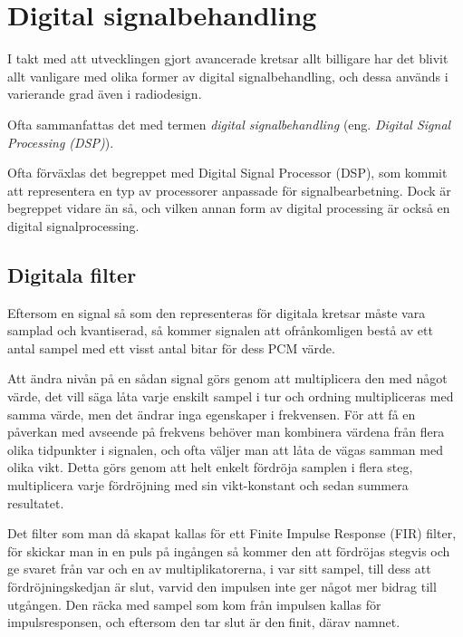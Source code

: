 \newpage
\section{Digital signalbehandling}

I takt med att utvecklingen gjort avancerade kretsar allt billigare har det
blivit allt vanligare med olika former av digital signalbehandling, och dessa
används i varierande grad även i radiodesign.

Ofta sammanfattas det med termen \emph{digital signalbehandling} (eng.
\emph{Digital Signal Processing (DSP)}).

Ofta förväxlas det begreppet med Digital Signal Processor (DSP), som kommit att
representera en typ av processorer anpassade för signalbearbetning.
Dock är begreppet vidare än så, och vilken annan form av digital processing är
också en digital signalprocessing.

\subsection{Digitala filter}
\label{digitala filter}

Eftersom en signal så som den representeras för digitala kretsar måste vara
samplad och kvantiserad, så kommer signalen att ofrånkomligen bestå av ett
antal sampel med ett visst antal bitar för dess PCM värde.

Att ändra nivån på en sådan signal görs genom att multiplicera den med något
värde, det vill säga låta varje enskilt sampel i tur och ordning multipliceras
med samma värde, men det ändrar inga egenskaper i frekvensen.
För att få en påverkan med avseende på frekvens behöver man kombinera värdena
från flera olika tidpunkter i signalen, och ofta väljer man att låta de
vägas samman med olika vikt.
Detta görs genom att helt enkelt fördröja samplen i flera steg,
multiplicera varje fördröjning med sin vikt-konstant och sedan summera
resultatet.

Det filter som man då skapat kallas för ett Finite Impulse Response (FIR)
filter, för skickar man in en puls på ingången så kommer den att fördröjas
stegvis och ge svaret från var och en av multiplikatorerna, i var sitt sampel,
till dess att fördröjningskedjan är slut, varvid den impulsen inte ger något
mer bidrag till utgången.
Den räcka med sampel som kom från impulsen kallas för impulsresponsen, och
eftersom den tar slut är den finit, därav namnet.

